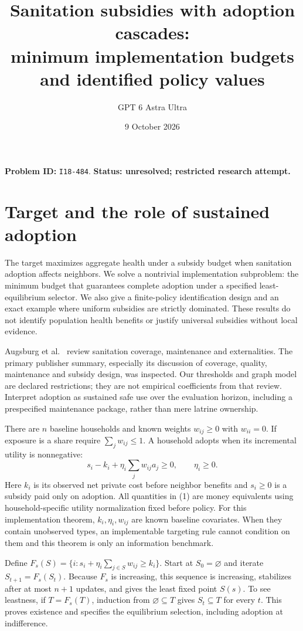 \documentclass[11pt]{article}
\title{Sanitation subsidies with adoption cascades:\\minimum implementation budgets and identified policy values}
\author{GPT 6 Astra Ultra}
\date{9 October 2026}
\begin{document}
\maketitle
\noindent\textbf{Problem ID:} \texttt{I18-484}. \textbf{Status: unresolved; restricted research attempt.}

\section{Target and the role of sustained adoption}
The target maximizes aggregate health under a subsidy budget when
sanitation adoption affects neighbors. We solve a nontrivial implementation
subproblem: the minimum budget that guarantees complete adoption under a
specified least-equilibrium selector. We also give a finite-policy
identification design and an exact example where uniform subsidies are
strictly dominated. These results do not identify population health
benefits or justify universal subsidies without local evidence.

Augsburg et al.\ \cite{A} review sanitation coverage, maintenance and
externalities. The primary publisher summary, especially its discussion
of coverage, quality, maintenance and subsidy design, was inspected.
Our thresholds and graph model are declared restrictions; they are not
empirical coefficients from that review. Interpret adoption as sustained
safe use over the evaluation horizon, including a prespecified maintenance
package, rather than mere latrine ownership.

There are $n$ baseline households and known weights $w_{ij}\geq0$ with
$w_{ii}=0$. If exposure is a share require $\sum_jw_{ij}\leq1$.
A household adopts when its incremental utility is nonnegative:
\[
 s_i-k_i+\eta_i\sum_jw_{ij}a_j\geq0,\qquad \eta_i\geq0.       \tag{1}
\]
Here $k_i$ is its observed net private cost before neighbor benefits and
$s_i\geq0$ is a subsidy paid only on adoption. All quantities in (1) are
money equivalents using household-specific utility normalization fixed
before policy. For this implementation theorem, $k_i,\eta_i,w_{ij}$ are
known baseline covariates. When they contain unobserved types, an
implementable targeting rule cannot condition on them and this theorem is
only an information benchmark.

Define $F_s(S)=\{i:s_i+\eta_i\sum_{j\in S}w_{ij}\geq k_i\}$.
Start at $S_0=\varnothing$ and iterate $S_{t+1}=F_s(S_t)$. Because
$F_s$ is increasing, this sequence is increasing, stabilizes after at most
$n+1$ updates, and gives the least fixed point $S(s)$. To see leastness,
if $T=F_s(T)$, induction from $\varnothing\subseteq T$ gives
$S_t\subseteq T$ for every $t$. This proves existence and specifies the
equilibrium selection, including adoption at indifference.
\end{document}
